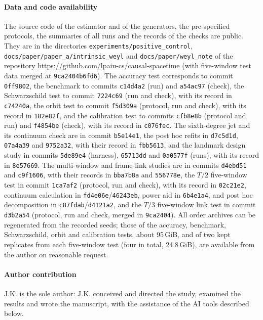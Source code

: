 \documentclass[11pt,a4paper]{article}
\begin{document}
\paragraph{Data and code availability} The source code of the estimator and
of the generators, the pre-specified protocols, the summaries of all runs
and the records of the checks are public. They are in the directories
\nolinkurl{experiments/positive_control},
\nolinkurl{docs/paper/paper_a/intrinsic_weyl} and
\nolinkurl{docs/paper/weyl_note} of the repository
\url{https://github.com/lpaiu-cs/causal-spacetime} (with five-window test data
merged at \texttt{9ca2404b6fd6}). The
accuracy test corresponds to commit \texttt{0ff9802}, the benchmark to
commits \texttt{c14d4a2} (run) and \texttt{a54ac97} (check), the
Schwarzschild test to commit \texttt{7224c69} (run and check), with its
record in \texttt{c74240a}, the orbit test to commit \texttt{f5d309a}
(protocol, run and check), with its record in \texttt{182e82f}, and the
calibration test to commits
\texttt{cfb8e8b} (protocol and run) and \texttt{f4854be} (check), with its
record in \texttt{c076fec}. The sixth-degree jet and its continuum check are
in commit \texttt{b5e14e1}, the post hoc refits in \texttt{d7c5d1d},
\texttt{07a4a39} and \texttt{9752a32}, with their
record in \texttt{fbb5613}, and the landmark design study in commits
\texttt{5de89e4} (harness), \texttt{65713dd} and \texttt{0a0577f} (runs),
with its record in \texttt{8e57669}. The multi-window and frame-link studies
are in commits \texttt{d4ebd51} and \texttt{c9f1606}, with their records in
\texttt{bba7b8a} and \texttt{556778e}, the $T/2$ five-window test in commit
\texttt{1ca7af2} (protocol, run and check), with its record in
\texttt{02c21e2}, continuum calculation in \texttt{fd4e06e}/\texttt{46243eb},
power aid in \texttt{6b4e1a4},
and post hoc decomposition in \texttt{c87fdab}/\texttt{d4121a2}, and the
$T/3$ five-window link test in commit \texttt{d3b2a54} (protocol, run and
check, merged in \texttt{9ca2404}). All order archives
can be regenerated from the recorded seeds; those of the accuracy,
benchmark, Schwarzschild, orbit and calibration tests, about 95\,GiB, and of
two kept replicates from each five-window test (four in total, 24.8\,GiB),
are available from the author on reasonable request.
\paragraph{Author contribution} J.K. is the sole author: J.K. conceived
and directed the study, examined the results and wrote the manuscript, with
the assistance of the AI tools described below.
\end{document}
